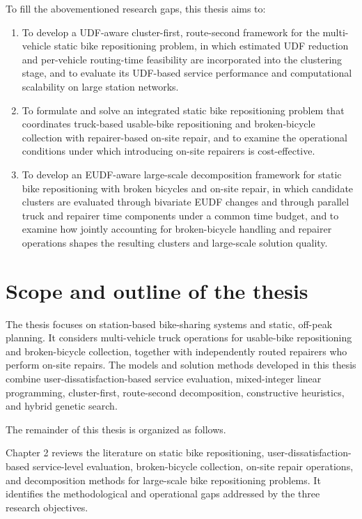 To fill the abovementioned research gaps, this thesis aims to:

\begin{enumerate}
    \item To develop a UDF-aware cluster-first, route-second framework for the multi-vehicle static bike repositioning problem, in which estimated UDF reduction and per-vehicle routing-time feasibility are incorporated into the clustering stage, and to evaluate its UDF-based service performance and computational scalability on large station networks.

    \item To formulate and solve an integrated static bike repositioning problem that coordinates truck-based usable-bike repositioning and broken-bicycle collection with repairer-based on-site repair, and to examine the operational conditions under which introducing on-site repairers is cost-effective.

    \item To develop an EUDF-aware large-scale decomposition framework for static bike repositioning with broken bicycles and on-site repair, in which candidate clusters are evaluated through bivariate EUDF changes and through parallel truck and repairer time components under a common time budget, and to examine how jointly accounting for broken-bicycle handling and repairer operations shapes the resulting clusters and large-scale solution quality.
\end{enumerate}

\section{Scope and outline of the thesis}\label{sec:intro-scope-outline}

The thesis focuses on station-based bike-sharing systems and static, off-peak planning. It considers multi-vehicle truck operations for usable-bike repositioning and broken-bicycle collection, together with independently routed repairers who perform on-site repairs. The models and solution methods developed in this thesis combine user-dissatisfaction-based service evaluation, mixed-integer linear programming, cluster-first, route-second decomposition, constructive heuristics, and hybrid genetic search.

The remainder of this thesis is organized as follows.

Chapter 2 reviews the literature on static bike repositioning, user-dissatisfac\-tion-based service-level evaluation, broken-bicycle collection, on-site repair operations, and decomposition methods for large-scale bike repositioning problems. It identifies the methodological and operational gaps addressed by the three research objectives.

